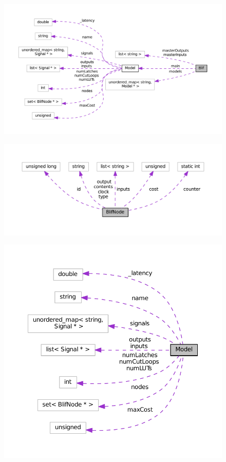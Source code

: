 \documentclass[12pt,final,oneside]{article} %
\begin{document}
   \begin{figure}
      \includegraphics{doxygen/classBlif__coll__graph.pdf}
   \end{figure}
   \begin{figure}
      \includegraphics{doxygen/classBlifNode__coll__graph.pdf}
   \end{figure}
   \begin{figure}
      \includegraphics{doxygen/classModel__coll__graph.pdf}
   \end{figure}
\end{document}
